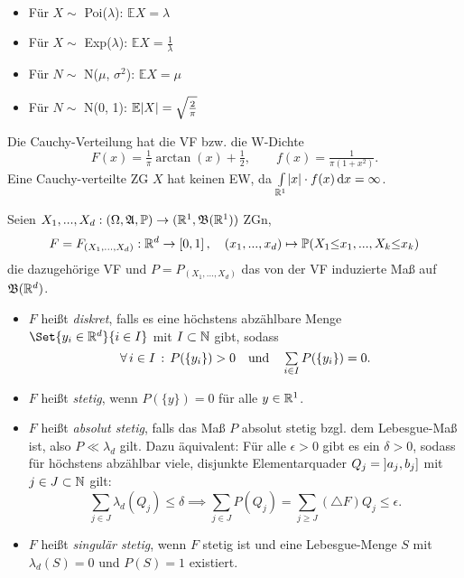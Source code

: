 \documentclass{cheat-sheet}
\newcommand{\Alg}{\mathfrak{A}} %
\renewcommand{\P}{\mathbb{P}} %
\newcommand{\E}{\mathbb{E}} %
\newcommand{\Bor}{\mathfrak{B}} %
\begin{document}

\begin{satz}\mbox{}\\[10pt]
  \begin{multicols}{2}
    \begin{itemize}
      \item Für $X \sim$ Poi($\lambda$): $\E X = \lambda$
      \item Für $X \sim$ Exp($\lambda$): $\E X = \tfrac{1}{\lambda}$
      \item Für $N \sim$ N($\mu$, $\sigma^2$): $\E X = \mu$
      \item Für $N \sim$ N(0, 1): $\E \abs{X} = \sqrt{\tfrac{2}{\pi}}$
    \end{itemize}
  \end{multicols}
\end{satz}

\begin{bem}
  Die Cauchy-Verteilung hat die VF bzw. die W-Dichte
  \[ F(x) = \tfrac{1}{\pi} \arctan(x) + \tfrac{1}{2}, \qquad f(x) = \tfrac{1}{\pi (1 + x^2)}. \]
  Eine Cauchy-verteilte ZG $X$ hat keinen EW, da ${\textstyle \int\limits_{\mathbb{R}^1}^{}} \lvert x\rvert \cdot f(x) \,\mathrm{d} x = \infty$.
\end{bem}

\begin{defn}
  Seien $X_1, ..., X_d : (\Omega, \Alg, \P) \to (\R^1, \Bor(\R^1))$ ZGn,
  \[ F = F_{(X_1, ..., X_d)} : \R^d \to \cinterval{0}{1}, \quad (x_1, ..., x_d) \mapsto \P(X_1 {\leq} x_1, ..., X_k {\leq} x_k) \]
  die dazugehörige VF und $P = P_{(X_1, ..., X_d)}$ das von der VF induzierte Maß auf $\Bor(\R^d)$.
  \begin{itemize}
    \item $F$ heißt \emph{diskret}, falls es eine höchstens abzählbare Menge $\Set{ y_i \in \R^d }{ i \in I }$ mit $I \subset \mathbb{N}$ gibt, sodass
    \[ \fa{i \in I} P(\{ y_i \}) > 0 \quad \text{und} \quad \sum_{i \in I} P(\{ y_i \}) = 0. \]
    \item $F$ heißt \emph{stetig}, wenn $P(\{ y \}) = 0$ für alle $y \in \mathbb{R}^1$.
    \item $F$ heißt \emph{absolut stetig}, falls das Maß $P$ absolut stetig bzgl. dem Lebesgue-Maß ist, also $P \ll \lambda_d$ gilt. Dazu äquivalent: Für alle $\epsilon > 0$ gibt es ein $\delta > 0$, sodass für höchstens abzählbar viele, disjunkte Elementarquader $Q_{j} = \left] a_j, b_j \right]$ mit $j \in J \subset \mathbb{N}$  gilt:
    \[ \sum_{j \in J} \lambda_d(Q_j) \leq \delta \implies \sum_{j \in J} P(Q_j) = \sum_{j \geq J} (\triangle F) Q_j \leq \epsilon. \]
    \item $F$ heißt \emph{singulär stetig}, wenn $F$ stetig ist und eine Lebesgue-Menge $S$ mit $\lambda_d(S) = 0$ und $P(S) = 1$ existiert.
  \end{itemize}
\end{defn}
\end{document}
